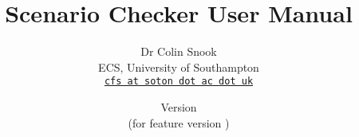 \documentclass[a4paper,10pt]{article}
\title{Scenario Checker User Manual}
\author{%
  Dr Colin Snook\\%
  ECS, University of Southampton\\%
  \texttt{\href{mailto:cfs@soton.ac.uk}{cfs at soton dot ac dot uk}}%
}%
\date{%
  Version \SCManualVersion\\%
  (for feature version \SCFeatureVersion)\\
  \ifplastex
  \SCManualDate
  \else
  \displaydate{SCManualDate}%
  \fi
}
\begin{document}
\ifplastex%
\maketitle%
\else%
 \ifstandalone%
 \maketitle %
 \else%
 \fi%
\fi%











%


\end{document}
